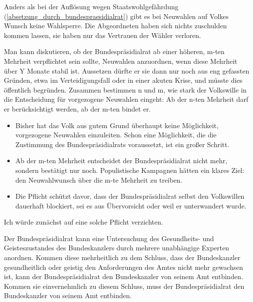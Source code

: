 Anders als bei der Auflösung wegen Staatswohlgefährdung (\cref{absetzung_durch_bundespraesidialrat}) gibt es bei Neuwahlen auf Volkes Wunsch keine Wahlsperre.
Die Abgeordneten haben sich nichts zuschulden kommen lassen, sie haben nur das Vertrauen der Wähler verloren.

Man kann diskutieren, ob der Bundespräsidialrat ab einer höheren, m-ten Mehrheit verpflichtet sein sollte, Neuwahlen anzuordnen, wenn diese Mehrheit über Y Monate stabil ist.
Aussetzen dürfte er sie dann nur noch aus eng gefassten Gründen, etwa im Verteidigungsfall oder in einer akuten Krise, und müsste dies öffentlich begründen.
Zusammen bestimmen n und m, wie stark der Volkswille in die Entscheidung für vorgezogene Neuwahlen eingeht: Ab der n-ten Mehrheit darf er berücksichtigt werden, ab der m-ten bindet er.

\begin{itemize}
  \item Bisher hat das Volk aus gutem Grund überhaupt keine Möglichkeit, vorgezogene Neuwahlen einzuleiten. Schon eine Möglichkeit, die die Zustimmung des Bundespräsidialrats voraussetzt, ist ein großer Schritt.
  \item Ab der m-ten Mehrheit entscheidet der Bundespräsidialrat nicht mehr, sondern bestätigt nur noch. Populistische Kampagnen hätten ein klares Ziel: den Neuwahlwunsch über die m-te Mehrheit zu treiben.
\end{itemize}

\begin{itemize}
  \item Die Pflicht schützt davor, dass der Bundespräsidialrat selbst den Volkswillen dauerhaft blockiert, sei es aus Übervorsicht oder weil er unterwandert wurde.
\end{itemize}

Ich würde zunächst auf eine solche Pflicht verzichten.

\label{subsubsubsec:abloesung_wegen_gesundheit_oder_geisteszustand}
Der Bundespräsidialrat kann eine Untersuchung des Gesundheits- und Geisteszustandes des Bundeskanzlers durch mehrere unabhängige Experten anordnen.
Kommen diese mehrheitlich zu dem Schluss, dass der Bundeskanzler gesundheitlich oder geistig den Anforderungen des Amtes nicht mehr gewachsen ist, kann der Bundespräsidialrat
den Bundeskanzler von seinem Amt entbinden.
Kommen sie einvernehmlich zu diesem Schluss, muss der Bundespräsidialrat den Bundeskanzler von seinem Amt entbinden.

